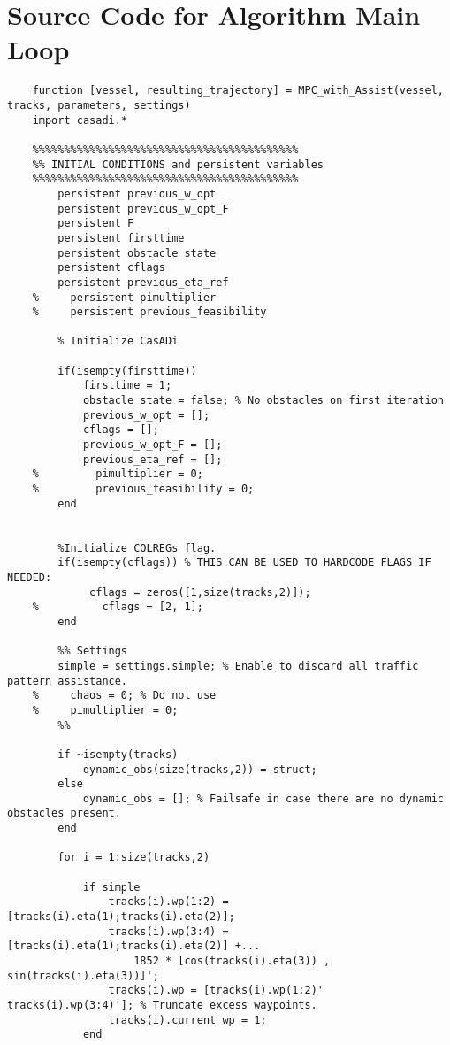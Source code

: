 
\appendix
\section{Source Code for Algorithm Main Loop}
\begin{lstlisting}
    function [vessel, resulting_trajectory] = MPC_with_Assist(vessel, tracks, parameters, settings)
    import casadi.*
    
    %%%%%%%%%%%%%%%%%%%%%%%%%%%%%%%%%%%%%%%%%%
    %% INITIAL CONDITIONS and persistent variables
    %%%%%%%%%%%%%%%%%%%%%%%%%%%%%%%%%%%%%%%%%%
        persistent previous_w_opt
        persistent previous_w_opt_F
        persistent F
        persistent firsttime
        persistent obstacle_state
        persistent cflags
        persistent previous_eta_ref
    %     persistent pimultiplier
    %     persistent previous_feasibility
           
        % Initialize CasADi
        
        if(isempty(firsttime))
            firsttime = 1;
            obstacle_state = false; % No obstacles on first iteration
            previous_w_opt = [];
            cflags = [];
            previous_w_opt_F = [];
            previous_eta_ref = [];
    %         pimultiplier = 0;
    %         previous_feasibility = 0;
        end
        
    
        %Initialize COLREGs flag.
        if(isempty(cflags)) % THIS CAN BE USED TO HARDCODE FLAGS IF NEEDED:
             cflags = zeros([1,size(tracks,2)]);
    %          cflags = [2, 1];
        end
    
        %% Settings
        simple = settings.simple; % Enable to discard all traffic pattern assistance.
    %     chaos = 0; % Do not use
    %     pimultiplier = 0;
        %%
        
        if ~isempty(tracks)
            dynamic_obs(size(tracks,2)) = struct;
        else
            dynamic_obs = []; % Failsafe in case there are no dynamic obstacles present.
        end
        
        for i = 1:size(tracks,2)
            
            if simple
                tracks(i).wp(1:2) = [tracks(i).eta(1);tracks(i).eta(2)];
                tracks(i).wp(3:4) = [tracks(i).eta(1);tracks(i).eta(2)] +...
                    1852 * [cos(tracks(i).eta(3)) , sin(tracks(i).eta(3))]';
                tracks(i).wp = [tracks(i).wp(1:2)' tracks(i).wp(3:4)']; % Truncate excess waypoints.
                tracks(i).current_wp = 1;
            end
        

\end{lstlisting}
